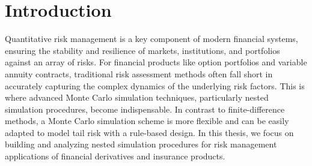 \chapter{Introduction}

Quantitative risk management is a key component of modern financial systems, ensuring the stability and resilience of markets, institutions, and portfolios against an array of risks. 
For financial products like option portfolios and variable annuity contracts, traditional risk assessment methods often fall short in accurately capturing the complex dynamics of the underlying risk factors.
This is where advanced Monte Carlo simulation techniques, particularly nested simulation procedures, become indispensable.
In contrast to finite-difference methods, a Monte Carlo simulation scheme is more flexible and can be easily adapted to model tail risk with a rule-based design.
In this thesis, we focus on building and analyzing nested simulation procedures for risk management applications of financial derivatives and insurance products.
